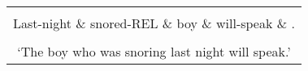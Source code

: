 \documentclass{standalone}  %
\begin{document}
\begin{comment}
\begin{tabular}{c}
\begin{dependency}[edge unit distance=3ex]
  \begin{deptext}
    Tl’éédą́ą́   \& ashkii \& ałhą́ą́’-ą́ą́  \& yádoołtih  \& . \\
    Last-night \& boy    \& snored-REL \& will-speak \& . \\
  \end{deptext}
  \depedge{3}{1}{advmod}
  \depedge{3}{2}{nsubj}
  \depedge{4}{3}{csubj:relcl}
  \depedge{4}{5}{punct}
  \deproot[edge unit distance=2.25ex]{4}{root}
  \depedge[edge below,blue,label style={blue,fill=white,text=blue},edge unit distance=4.5ex]{4}{2}{nsubj}
  \depedge[edge below]{3}{1}{advmod}
  \depedge[edge below]{3}{2}{nsubj}
  \depedge[edge below]{4}{3}{csubj:relcl}
  \depedge[edge below]{4}{5}{punct}
  \deproot[edge below]{4}{root}
\end{dependency} \\
`The boy who was snoring last night will speak.' \\
\end{tabular}
\end{comment}
\begin{tabular}{c}
\begin{dependency}[edge unit distance=3ex]
  \begin{deptext}
    Tl’éédą́ą́   \& ałhą́ą́’-ą́ąą \& ashkii \& yádoołtih  \& . \\
    Last-night \& snored-REL \& boy    \& will-speak \& . \\
  \end{deptext}
  \depedge{2}{1}{advmod}
  \depedge{3}{2}{acl:relcl}
  \depedge{4}{3}{nsubj}
  \depedge{4}{5}{punct}
  \deproot[edge unit distance=1.75ex]{4}{root}
  \depedge[edge below]{2}{1}{advmod}
  \depedge[edge below,blue,label style={blue,fill=white,text=blue},edge unit distance=6ex]{2}{3}{nsubj}
  \depedge[edge below]{3}{2}{acl:relcl}
  \depedge[edge below]{4}{3}{nsubj}
  \depedge[edge below]{4}{5}{punct}
  \deproot[edge below,edge unit distance=2.25ex]{4}{root}
\end{dependency} \\
`The boy who was snoring last night will speak.' \\
\end{tabular}
\end{document}
